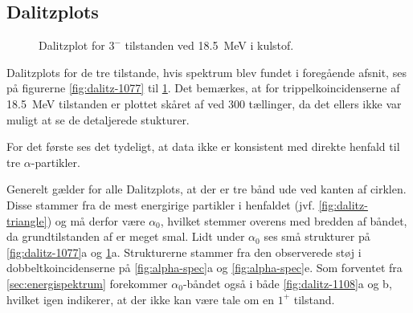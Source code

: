 \subsection{Dalitzplots}
\label{sec:dalitz-plots}

\begin{figure}[ht!]
  \centering
  \vspace{-0.3cm}
  \hfill
  \caption{Dalitzplot for $0^{+}$ tilstanden ved \SI{17.8}{\MeV} i kulstof.}
  \label{fig:dalitz-1077}
  \hfill
  \caption{Dalitzplot for $1^{+}$ tilstanden ved \SI{18.2}{\MeV} i kulstof.}
  \label{fig:dalitz-1108}
  \hfill
  \caption{Dalitzplot for $3^{-}$ tilstanden ved \SI{18.5}{\MeV} i kulstof.}
  \label{fig:dalitz-1128}
  \vspace{-1.3cm}
\end{figure}

Dalitzplots for de tre tilstande, hvis spektrum blev fundet i foregående afsnit, ses på figurerne
\ref{fig:dalitz-1077} til \ref{fig:dalitz-1128}. Det bemærkes, at for trippelkoincidenserne af
\SI{18.5}{\MeV} tilstanden er plottet skåret af ved 300 tællinger, da det ellers ikke var muligt at
se de detaljerede stukturer.

For det første ses det tydeligt, at data ikke er konsistent med direkte henfald til tre
$\alpha$-partikler.

Generelt gælder for alle Dalitzplots, at der er tre bånd ude ved kanten af cirklen. Disse
stammer fra de mest energirige partikler i henfaldet (jvf. \cref{fig:dalitz-triangle}) og må derfor
være $\alpha_{0}$, hvilket stemmer overens med bredden af båndet, da grundtilstanden af \Be er meget
smal. Lidt under $\alpha_{0}$ ses små strukturer på \cref{fig:dalitz-1077}a og
\ref{fig:dalitz-1128}a. Strukturerne stammer fra den observerede støj i dobbeltkoincidenserne på
\cref{fig:alpha-spec}a og \ref{fig:alpha-spec}e. Som forventet fra \cref{sec:energispektrum}
forekommer $\alpha_{0}$-båndet også i både \ref{fig:dalitz-1108}a og b, hvilket igen indikerer, at der
ikke kan være tale om en $1^{+}$ tilstand.

